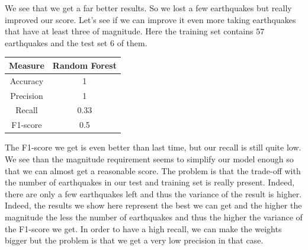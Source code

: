 \documentclass[10pt,conference,compsocconf]{IEEEtran}
\begin{document}
We see that we get a far better results. So we lost a few earthquakes but really improved our score. Let's see if we can improve it even more taking earthquakes that have at least three of magnitude. Here the training set contains $57$ earthquakes and the test set $6$ of them.

\begin{center}
 \begin{tabular}{||c c||} 
 \hline
 Measure & Random Forest \\ [0.5ex] 
 \hline\hline
 Accuracy & 1 \\ 
 \hline
 Precision & 1 \\
 \hline
 Recall & 0.33 \\
 \hline
 F1-score & 0.5 \\ [1ex]
 \hline
\end{tabular}
\end{center}

The F1-score we get is even better than last time, but our recall is still quite low. We see than the magnitude requirement seems to simplify our model enough so that we can almost get a reasonable score. The problem is that the trade-off with the number of earthquakes in our test and training set is really present. Indeed, there are only a few earthquakes left and thus the variance of the result is higher. Indeed, the results we show here represent the best we can get and the higher the magnitude the less the number of earthquakes and thus the higher the variance of the F1-score we get. In order to have a high recall, we can make the weights bigger but the problem is that we get a very low precision in that case.
\end{document}
